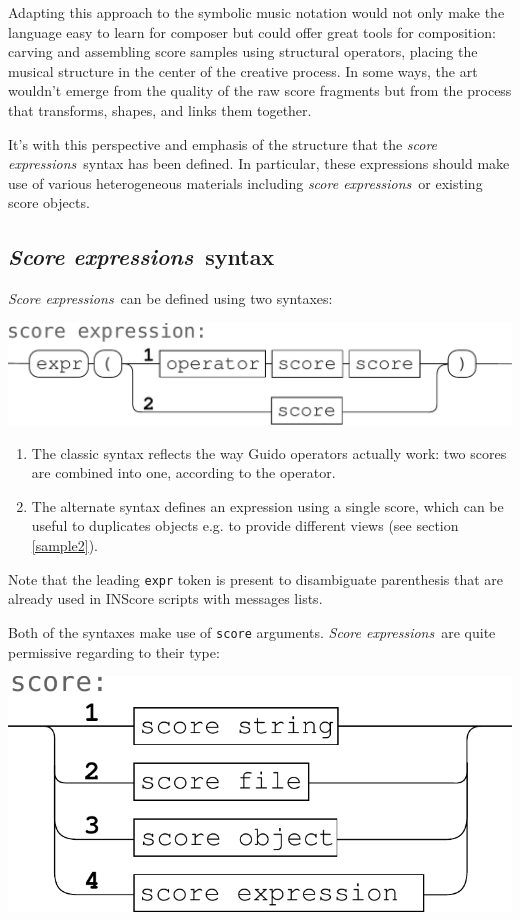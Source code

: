 \documentclass{article}
\newcommand{\OSC}[1]{{\fontsize{10pt}{10pt} \selectfont\texttt{#1}}}
\newcommand{\sExpr}{\emph{score expressions}}
\newcommand{\SExpr}{\emph{Score expressions}}
\begin{document}
Adapting this approach to the symbolic music notation would not only make the language easy to learn for composer but could offer great tools for composition: carving and assembling score samples using structural operators, placing the musical structure in the center of the creative process. In some ways, the art wouldn't emerge from the quality of the raw score fragments but from the process that transforms, shapes, and links them together. 

It's with this perspective 
and emphasis of the structure that the \sExpr\ syntax has been defined. In particular, these expressions should make use of various heterogeneous materials including \sExpr\ or existing score objects.

\subsection{\SExpr\ syntax}
\smallbreak
\SExpr\ can be defined using two syntaxes:
\begin{center}
\includegraphics[width=0.9\columnwidth]{imgs/syntax1}
\end{center}

\begin{enumerate}
\item The classic syntax reflects the way Guido operators actually work: two scores are combined into one, according to the operator.
\item The alternate syntax defines an expression using a single score, which can be useful to duplicates objects e.g. to provide different views (see section \ref{sample2}).
\end{enumerate}

Note that the leading \OSC{expr} token is present to disambiguate parenthesis that are already used in INScore scripts with messages lists.

Both of the syntaxes make use of \OSC{score} arguments. \SExpr\ are quite permissive regarding to their type:
\begin{center}
\includegraphics[width=0.7\columnwidth]{imgs/syntax2}
\end{center}
\end{document}
